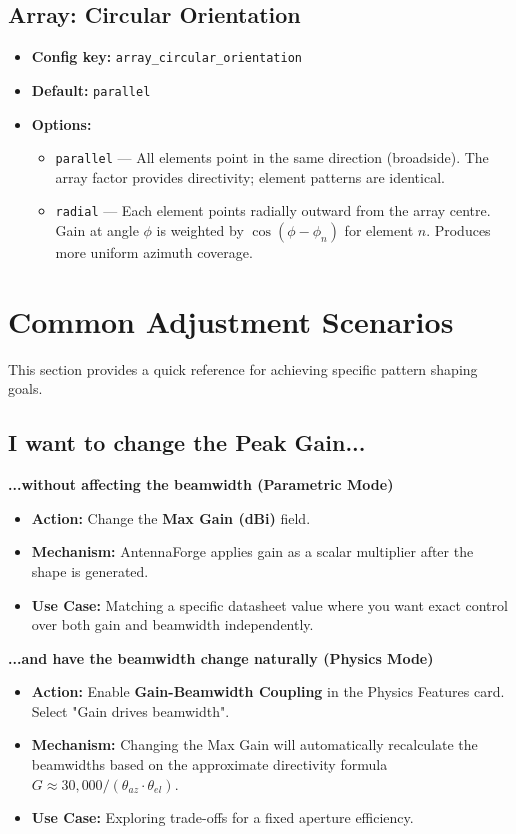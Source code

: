 \documentclass[11pt,a4paper]{article}
\begin{document}
\subsection{Array: Circular Orientation}
\begin{itemize}
    \item \textbf{Config key:} \texttt{array\_circular\_orientation}
    \item \textbf{Default:} \texttt{parallel}
    \item \textbf{Options:}
    \begin{itemize}
        \item \texttt{parallel} --- All elements point in the same direction (broadside). The array factor provides directivity; element patterns are identical.
        \item \texttt{radial} --- Each element points radially outward from the array centre. Gain at angle $\phi$ is weighted by $\cos(\phi - \phi_n)$ for element $n$. Produces more uniform azimuth coverage.
    \end{itemize}
\end{itemize}

\newpage
\section{Common Adjustment Scenarios}

This section provides a quick reference for achieving specific pattern shaping goals.

\subsection{I want to change the Peak Gain...}

\textbf{...without affecting the beamwidth (Parametric Mode)}
\begin{itemize}
    \item \textbf{Action:} Change the \textbf{Max Gain (dBi)} field.
    \item \textbf{Mechanism:} AntennaForge applies gain as a scalar multiplier after the shape is generated.
    \item \textbf{Use Case:} Matching a specific datasheet value where you want exact control over both gain and beamwidth independently.
\end{itemize}

\textbf{...and have the beamwidth change naturally (Physics Mode)}
\begin{itemize}
    \item \textbf{Action:} Enable \textbf{Gain-Beamwidth Coupling} in the Physics Features card. Select "Gain drives beamwidth".
    \item \textbf{Mechanism:} Changing the Max Gain will automatically recalculate the beamwidths based on the approximate directivity formula $G \approx 30,000 / (\theta_{az} \cdot \theta_{el})$.
    \item \textbf{Use Case:} Exploring trade-offs for a fixed aperture efficiency.
\end{itemize}
\end{document}
